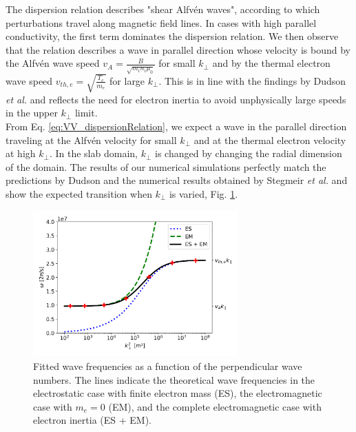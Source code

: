 The dispersion relation describes "shear Alfvén waves", according to which perturbations travel along magnetic field lines. In cases with high parallel conductivity, the first term dominates the dispersion relation. We then observe that the relation describes a wave in parallel direction whose velocity is bound by the Alfvén wave speed $v_A = \frac{B}{\sqrt{m_in_i\mu_0}}$ for small $k_\perp$ and by the thermal electron wave speed $v_ {th,e} = \sqrt{\frac{T_e}{m_e}}$ for large $k_\perp$. This is in line with the findings by Dudson \emph{et al.}\cite{Dudson2021} and reflects the need for electron inertia to avoid unphysically large speeds in the upper $k_\perp$ limit. \\

From Eq. \ref{eq:VV_dispersionRelation}, we expect a wave in the parallel direction traveling at the Alfvén velocity for small $k_\perp$ and at the thermal electron velocity at high $k_\perp$. In the slab domain, $k_\perp$ is changed by changing the radial dimension of the domain. The results of our numerical simulations perfectly match the predictions by Dudson \cite{Dudson2021} and the numerical results obtained by Stegmeir \emph{et al.}\cite{stegmeir2019} and show the expected transition when $k_\perp$ is varied, Fig. \ref{fig:transitionSLAB}. \newline

\begin{figure}[h]\centering
	\centering
	\includegraphics[width=0.7\textwidth]{schemes/transitionAlfvenThermal.png}
	\caption[Fitted wave frequencies as a function of the perpendicular wave numbers]{Fitted wave frequencies as a function of the perpendicular wave numbers. The lines indicate the theoretical wave frequencies in the electrostatic case with finite electron mass (ES), the electromagnetic case with $m_e = 0$ (EM), and the complete electromagnetic case with electron inertia (ES + EM).}
	\label{fig:transitionSLAB}
\end{figure}


